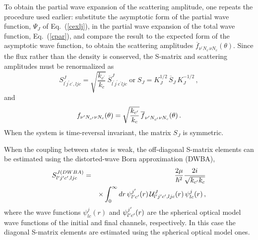 To obtain the partial wave expansion of the scattering amplitude, one
repeats the procedure used earlier: substitute the asymptotic form of the
partial wave function, $\Psi_{J}$ of Eq.~(\ref{cexlj}), in the partial wave
expansion of the total wave function, Eq.~(\ref{cpar}), and compare the
result to the expected form of the asymptotic wave function, to obtain the
scattering amplitudes $\overline{f}_{\nu^{\prime}N_{c^{\prime}}\nu
N_{c}}(\theta) $. Since the flux rather than the density is conserved, the
S-matrix and scattering amplitudes must be renormalized as
\begin{equation}
S_{l^{\prime}j^{\prime}c^{\prime},ljc}^{J}=\sqrt{\frac{k_{c^{\prime}}}{k_{c}}%
}\,\overline{S}_{l^{\prime}j^{\prime}c^{\prime}ljc}^{J}\;\text{or}\;
S_{J}=K_{J}^{1/2}\,\overline{S}_{J}\, K_{J}^{-1/2}\,,
\end{equation}
and
\begin{equation}
f_{\nu^{\prime}N_{c^{\prime}}\nu N_{c}}(\theta)=\sqrt{\frac{k_{c^{\prime}}}{%
k_{c}}}\,\overline{f}_{\nu^{\prime}N_{c^{\prime}}\nu N_{c}}(\theta)\,.
\end{equation}
When the system is time-reversal invariant, the matrix $S_{J}$ is symmetric.

When the coupling between states is weak, the off-diagonal S-matrix elements
can be estimated using the distorted-wave Born approximation (DWBA),
\begin{eqnarray}
S_{l^{\prime}j^{\prime}c^{\prime},ljc}^{J(DWBA)} & = & \frac{2\mu}{\hbar^2}%
\frac{2i}{\sqrt{k_{c^{\prime}}k_c}} \\
& & \times \int_0^{\infty}dr\, \psi_{l^{\prime}c^{\prime}}^{j^{\prime}}(r)\,{%
\mathcal{U}}_{l^{\prime}j^{\prime}c^{\prime},ljc}^{J}(r)\,\psi_{lc}^{j}(r)\,,
\nonumber
\end{eqnarray}
where the wave functions $\psi_{lc}^{j}(r)$ and $\psi_{l^{\prime}c^{%
\prime}}^{j^{\prime}}(r)$ are the spherical optical model wave functions of
the initial and final channels, respectively. In this case the diagonal
S-matrix elements are estimated using the spherical optical model ones.

